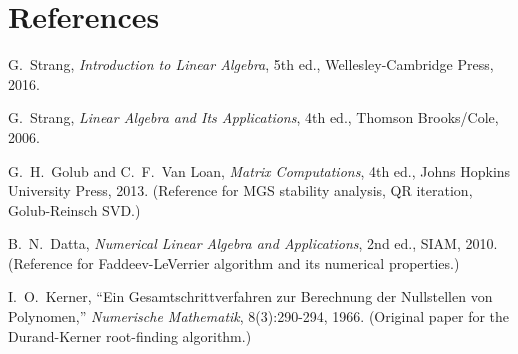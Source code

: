 \documentclass[12pt, a4paper]{article}
\begin{document}
\section{References}

\begin{enumerate}[label={[\arabic*]}, leftmargin=2em, noitemsep]
  \item G.\ Strang, \emph{Introduction to Linear Algebra}, 5th ed.,
        Wellesley-Cambridge Press, 2016.
  \item G.\ Strang, \emph{Linear Algebra and Its Applications}, 4th ed.,
        Thomson Brooks/Cole, 2006.
  \item G.\ H.\ Golub and C.\ F.\ Van Loan, \emph{Matrix Computations},
        4th ed., Johns Hopkins University Press, 2013.
        (Reference for MGS stability analysis, QR iteration, Golub-Reinsch SVD.)
  \item B.\ N.\ Datta, \emph{Numerical Linear Algebra and Applications},
        2nd ed., SIAM, 2010.
        (Reference for Faddeev-LeVerrier algorithm and its numerical properties.)
  \item I.\ O.\ Kerner, ``Ein Gesamtschrittverfahren zur Berechnung der
        Nullstellen von Polynomen,'' \emph{Numerische Mathematik}, 8(3):290-294,
        1966.  (Original paper for the Durand-Kerner root-finding algorithm.)
\end{enumerate}
\end{document}
